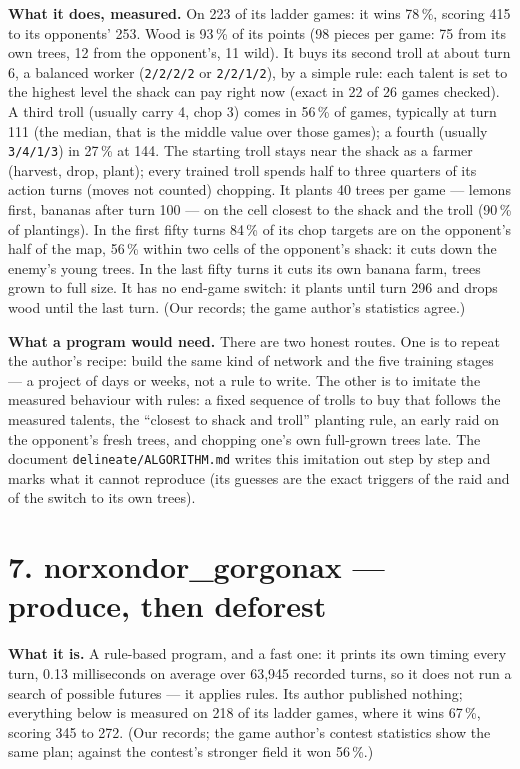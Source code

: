 \documentclass[10pt,a4paper]{article}
\newcommand{\src}[1]{{\small\color{muted}#1}}
\begin{document}
\textbf{What it does, measured.} On 223 of its ladder games: it wins 78\,\%, scoring 415 to its opponents' 253. Wood is 93\,\% of its points (98 pieces per game: 75 from its own trees, 12 from the opponent's, 11 wild). It buys its second troll at about turn 6, a balanced worker (\texttt{2/2/2/2} or \texttt{2/2/1/2}), by a simple rule: each talent is set to the highest level the shack can pay right now (exact in 22 of 26 games checked). A third troll (usually carry 4, chop 3) comes in 56\,\% of games, typically at turn 111 (the median, that is the middle value over those games); a fourth (usually \texttt{3/4/1/3}) in 27\,\% at 144. The starting troll stays near the shack as a farmer (harvest, drop, plant); every trained troll spends half to three quarters of its action turns (moves not counted) chopping. It plants 40 trees per game --- lemons first, bananas after turn 100 --- on the cell closest to the shack and the troll (90\,\% of plantings). In the first fifty turns 84\,\% of its chop targets are on the opponent's half of the map, 56\,\% within two cells of the opponent's shack: it cuts down the enemy's young trees. In the last fifty turns it cuts its own banana farm, trees grown to full size. It has no end-game switch: it plants until turn 296 and drops wood until the last turn. \src{(Our records; the game author's statistics agree.)}

\textbf{What a program would need.} There are two honest routes. One is to repeat the author's recipe: build the same kind of network and the five training stages --- a project of days or weeks, not a rule to write. The other is to imitate the measured behaviour with rules: a fixed sequence of trolls to buy that follows the measured talents, the ``closest to shack and troll'' planting rule, an early raid on the opponent's fresh trees, and chopping one's own full-grown trees late. The document \texttt{delineate/ALGORITHM.md} writes this imitation out step by step and marks what it cannot reproduce (its guesses are the exact triggers of the raid and of the switch to its own trees).

\section*{7. norxondor\_gorgonax --- produce, then deforest}

\textbf{What it is.} A rule-based program, and a fast one: it prints its own timing every turn, 0.13 milliseconds on average over 63,945 recorded turns, so it does not run a search of possible futures --- it applies rules. Its author published nothing; everything below is measured on 218 of its ladder games, where it wins 67\,\%, scoring 345 to 272. \src{(Our records; the game author's contest statistics show the same plan; against the contest's stronger field it won 56\,\%.)}
\end{document}
